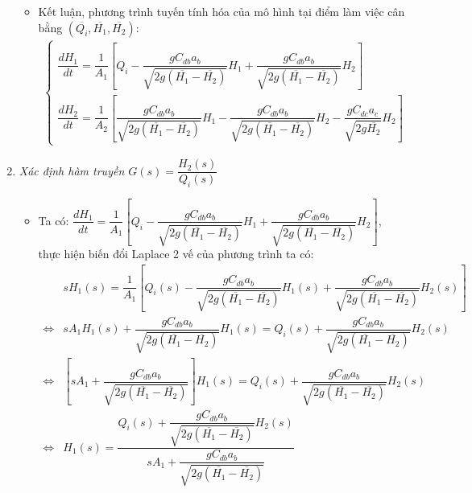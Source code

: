 \begin{enumerate}[\it a.]
\begin{itemize}
                \item Kết luận, phương trình tuyến tính hóa của mô hình tại điểm làm việc cân bằng $\left({\overline{Q_i}, \overline{H_1}, \overline{H_2}}\right)$:
                    \begin{align}
                        \left\{
                        \begin{array}{l}
                            \dfrac{dH_1}{dt} = \dfrac{1}{A_1} \left[{Q_i - \dfrac{gC_{db}a_b}{\sqrt{2g(\overline{H_1} - \overline{H_2})}} H_1 + \dfrac{gC_{db}a_b}{\sqrt{2g(\overline{H_1} - \overline{H_2})}} H_2}\right]\\ [.5cm]
                            \dfrac{dH_2}{dt} = \dfrac{1}{A_2} \left[{\dfrac{g C_{db}a_b}{\sqrt{2g(\overline{H_1} - \overline{H_2})}} H_1 - \dfrac{g C_{db}a_b}{\sqrt{2g(\overline{H_1} - \overline{H_2})}} H_2 - \dfrac{g C_{dc}a_c}{\sqrt{2g\overline{H_2}}} H_2}\right]
                        \end{array}
                        \right.
                    \end{align}
            \end{itemize}

        \item \textit{Xác định hàm truyền $G(s) = \dfrac{H_2(s)}{Q_i(s)}$}
            \begin{itemize}
                \item Ta có: $\dfrac{dH_1}{dt} = \dfrac{1}{A_1} \left[{Q_i - \dfrac{gC_{db}a_b}{\sqrt{2g(\overline{H_1} - \overline{H_2})}} H_1 + \dfrac{gC_{db}a_b}{\sqrt{2g(\overline{H_1} - \overline{H_2})}} H_2}\right]$, thực hiện biến đổi Laplace 2 vế của phương trình ta có:
                    \begin{align}
                        & s H_1(s) = \dfrac{1}{A_1} \left[{Q_i(s) - \dfrac{gC_{db}a_b}{\sqrt{2g(\overline{H_1} - \overline{H_2})}} H_1(s) + \dfrac{gC_{db}a_b}{\sqrt{2g(\overline{H_1} - \overline{H_2})}} H_2(s)}\right]\\
                        \Longleftrightarrow & s A_1 H_1(s) + \dfrac{gC_{db}a_b}{\sqrt{2g(\overline{H_1} - \overline{H_2})}} H_1(s) = Q_i(s) + \dfrac{gC_{db}a_b}{\sqrt{2g(\overline{H_1} - \overline{H_2})}} H_2(s)\\
                        \Longleftrightarrow & \left[{s A_1 + \dfrac{gC_{db}a_b}{\sqrt{2g(\overline{H_1} - \overline{H_2})}}}\right] H_1(s) = Q_i(s) + \dfrac{gC_{db}a_b}{\sqrt{2g(\overline{H_1} - \overline{H_2})}} H_2(s) \\
                        \Longleftrightarrow & H_1(s) = \dfrac{Q_i(s) + \dfrac{gC_{db}a_b}{\sqrt{2g(\overline{H_1} - \overline{H_2})}} H_2(s)}{s A_1 + \dfrac{gC_{db}a_b}{\sqrt{2g(\overline{H_1} - \overline{H_2})}}}
                    \end{align}


\end{itemize}
\end{enumerate}
